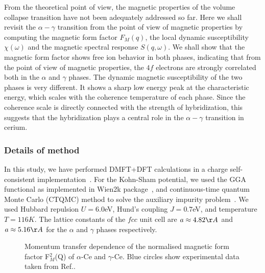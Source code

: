 \documentclass[10pt]{ruthesis}
\begin{document}
{From the theoretical point of view, the magnetic properties of the
volume collapse transition have not been adequately addressed so far.
Here we shall revisit the $\alpha-\gamma$ transition from the point of
view of magnetic properties by computing the magnetic form factor
$F_{M}(q)$, the local dynamic susceptibility $\chi(\omega)$ and the
magnetic spectral response $S(q,\omega)$. We shall show that the
magnetic form factor shows free ion behavior in both phases,
indicating that from the point of view of magnetic properties, the
$4f$ electrons are strongly correlated both in the $\alpha$ and
$\gamma$ phases.  The dynamic magnetic susceptibility of the two
phases is very different. It shows a sharp low energy peak at the
characteristic energy, which scales with the coherence temperature of each
phase. Since the coherence scale is directly connected with the
strength of hybridization, this suggests that the hybridization plays
a central role in the $\alpha-\gamma$ transition in cerium.

\subsubsection{Details of method}

 In this study, we have performed DMFT+DFT calculations in a charge self-consistent
implementation~\cite{hauleLDADMFT}. For the Kohn-Sham potential, we used the GGA functional
as implemented in Wien2k package~\cite{wien2k}, and continuous-time
quantum Monte Carlo (CTQMC) method to solve the auxiliary impurity
problem~\cite{hauleCTQMC}.  We used Hubbard repulsion $U=6.0$eV,
Hund's coupling $J=0.7$eV, and temperature $T=116K$.  The lattice
constants of the $fcc$ unit cell are $a \approx 4.82\AA$ and $a\approx
5.16\AA$ for the $\alpha$ and $\gamma$ phases respectively.


%
\begin{figure}[!t]
\caption{Momentum transfer dependence of the normalised magnetic form factor F$^2_M$(Q) of $\alpha$-Ce and $\gamma$-Ce. Blue circles show experimental data taken from Ref.\cite{murani}. 
}
\label{fig1_Ce}
\end{figure}
%


}
\end{document}
